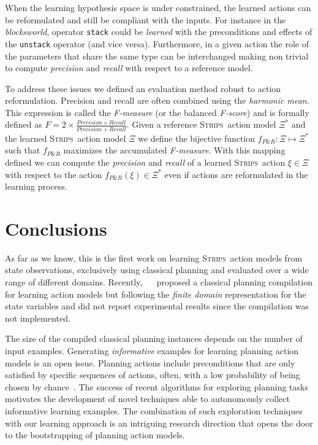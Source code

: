 \documentclass{article}
\newcommand{\strips}{\textsc{Strips}}     %
\begin{document}
When the learning hypothesis space is under constrained, the learned actions can be reformulated and still be compliant with the inputs. For instance in the {\em blocksworld}, operator {\small\tt stack} could be {\em learned} with the preconditions and effects of the {\small\tt unstack} operator (and vice versa). Furthermore, in a given action the role of the parameters that share the same type can be interchanged making non trivial to compute {\em precision} and {\em recall} with respect to a reference model.

To address these issues we defined an evaluation method robust to action reformulation. Precision and recall are often combined using the {\em harmonic mean}. This expression is called the {\em F-measure} (or the balanced {\em F-score}) and is formally defined as $F=2\times\frac{Precision\times Recall}{Precision+Recall}$. Given a reference \strips\ action model $\Xi^*$ and the learned \strips\ action model $\Xi$ we define the bijective function $f_{P\&R}:\Xi \mapsto \Xi^*$ such that $f_{P\&R}$ maximizes the accumulated {\em F-measure}. With this mapping defined we can compute the {\em precision} and {\em recall} of a learned \strips\ action $\xi\in\Xi$ with respect to the action $f_{P\&R}(\xi)\in \Xi^*$ even if actions are reformulated in the learning process.


\section{Conclusions}
As far as we know, this is the first work on learning \strips\ action models from state observations, exclusively using classical planning and evaluated over a wide range of different domains. Recently, ~\citeauthor{stern2017efficient}~\citeyear{stern2017efficient} proposed a classical planning compilation for learning action models but following the {\em finite domain} representation for the state variables and did not report experimental results since the compilation was not implemented.


The size of the compiled classical planning instances depends on the number of input examples. Generating {\em informative} examples for learning planning action models is an open issue. Planning actions include preconditions that are only satisfied by specific sequences of actions, often, with a low probability of being chosen by chance~\cite{fern2004learning}. The success of recent algorithms for exploring planning tasks~\cite{geffner:novelty:IJCAI17} motivates the development of novel techniques able to autonomously collect informative learning examples. The combination of such exploration techniques with our learning approach is an intriguing research direction that opens the door to the bootstrapping of planning action models.
\end{document}
